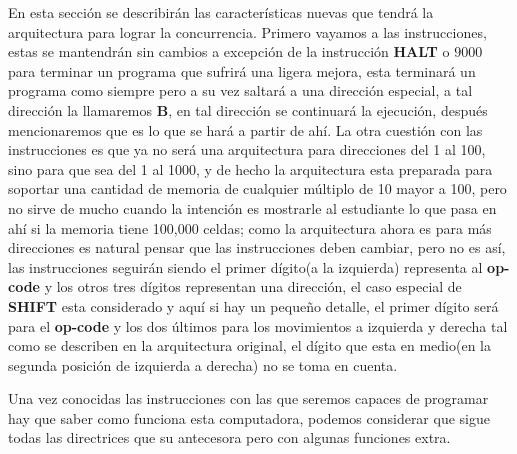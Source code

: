 \documentclass[12pt]{article}
\begin{document}
	
	
	
	En esta sección se describirán las características nuevas que tendrá la arquitectura para lograr la concurrencia. Primero vayamos a
	las instrucciones, estas se mantendrán sin cambios a excepción de la instrucción \textbf{HALT} o $9000$ para terminar un programa que
	sufrirá una ligera mejora, esta terminará un programa como siempre pero a su vez saltará a una dirección especial, a tal
	dirección la llamaremos \textbf{B}, en tal dirección se continuará la ejecución, después mencionaremos que es lo que se hará a partir
	de ahí. La otra cuestión con las instrucciones es que ya no será una arquitectura para direcciones del 1 al 100, sino para
	que sea del 1 al 1000, y de hecho la arquitectura esta preparada para soportar una cantidad de memoria de cualquier múltiplo de 10 mayor
	a 100, pero no sirve de mucho cuando la intención es mostrarle al estudiante lo que pasa en ahí si la memoria tiene
	100,000 celdas; como la arquitectura ahora es para más direcciones es natural pensar que las instrucciones deben cambiar, pero no es
	así, las instrucciones seguirán siendo el primer dígito(a la izquierda) representa al \textbf{op-code} y los otros
	tres dígitos representan una dirección, el caso especial de \textbf{SHIFT} esta considerado y aquí si hay un pequeño detalle,
	el primer dígito será para el \textbf{op-code} y los dos últimos para los movimientos a izquierda y derecha tal como
	se describen en la arquitectura original, el dígito que esta en medio(en la segunda posición de izquierda a derecha) no
	se toma en cuenta.
	
	Una vez conocidas las instrucciones con las que seremos capaces de programar hay que saber como funciona esta computadora, podemos
	considerar que sigue todas las directrices que su antecesora pero con algunas funciones extra.
	
\end{document}
